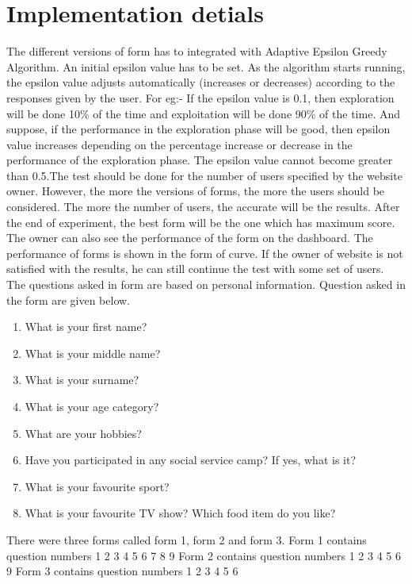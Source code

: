 \documentclass[12pt]{report}
\begin{document}
\chapter{Implementation detials}
The different versions of form has to integrated with Adaptive Epsilon Greedy Algorithm. An initial epsilon value has to be set. As the algorithm starts running, the epsilon value adjusts automatically (increases or decreases) according to the responses given by the user. 
For eg:- If the epsilon value is 0.1, then exploration will be done 10\% of the time and exploitation will be done 90\% of the time. And suppose, if the performance in the exploration phase will be good, then epsilon value increases depending on the percentage increase or decrease in the performance of the exploration phase. The epsilon value cannot become greater than 0.5.The test should be done for the number of users specified by the website owner. However, the more the versions of forms, the more the users should be considered. The more the number of users, the accurate will be the results.
\newline
After the end of experiment, the best form will be the one which has maximum score. The owner can also see the performance of the form on the dashboard. The performance of forms is shown in the form of curve. If the owner of website is not satisfied with the results, he can still continue the test with some set of users.
\newline
\newline
The questions asked in form are based on personal information. Question asked in the form are given below.
\begin{enumerate}
\item What is your first name?
\item What is your middle name?
\item What is your surname?
\item What is your age category?
\item What are your hobbies?
\item Have you participated in any social service camp? If yes, what is it?
\item What is your favourite sport?
\item What is your favourite TV show?
Which food item do you like?
\end{enumerate}
There were three forms called form 1, form 2 and form 3.
\newline
Form 1 contains question numbers 1 2 3 4 5 6 7 8 9
\newline
Form 2 contains question numbers 1 2 3 4 5 6 9
\newline
Form 3 contains question numbers 1 2 3 4 5 6
\newline
\end{document}
